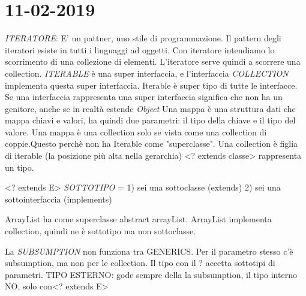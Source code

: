 

\newpage
\section{11-02-2019}
\par

\textit{ITERATORE}: E' un pattner, uno stile di programmazione. Il pattern degli iteratori esiste in tutti i linguaggi ad oggetti. Con iteratore intendiamo lo scorrimento di una collezione di elementi. L'iteratore serve quindi a scorrere una collection.\newline
\textit{ITERABLE} è una super interfaccia, e l'interfaccia \textit{COLLECTION} implementa questa super interfaccia. Iterable è super tipo di tutte le interfacce. \newline
Se una interfaccia rappresenta una super interfaccia significa che non ha un genitore, anche se in realtà estende \textit{Object}
\newline
Una mappa è una struttura dati che mappa chiavi e valori, ha quindi due parametri: il tipo della chiave e il tipo del valore. Una mappa è una collection solo se vista come una collection di coppie.Questo perchè non ha Iterable come "superclasse". \newline
Una collection è figlia di iterable (la posizione più alta nella gerarchia)\newline
<? extends classe> rappresenta un tipo. \newline

<? extends E> \newline
\textit{SOTTOTIPO} = 1) sei una sottoclasse (extends) 2) sei una sottointerfaccia (implements)
\newline


ArrayList ha come superclasse abstract arrayList. ArrayList implementa collection, quindi ne è sottotipo ma non sottoclasse.
\newline


La \textit{SUBSUMPTION} non funziona tra GENERICS. Per il parametro stesso c'è subsumption, ma non per le collection. Il tipo con
 il ? accetta sottotipi di parametri.
\newline
TIPO ESTERNO: gode sempre della la subsumption, il tipo interno NO, solo con<? extends E>  \newline

